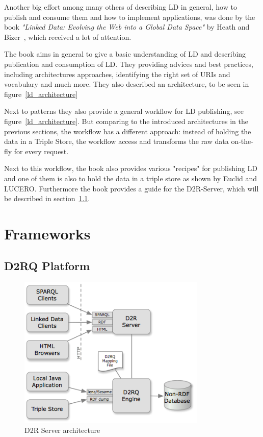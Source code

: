 Another big effort among many others of describing LD in general, how to publish and consume them and how to implement applications, was done by the book \emph{"Linked Data: Evolving the Web into a Global Data Space"} by Heath and Bizer~\cite{heath2011linked}, which received a lot of attention.

The book aims in general to give a basic understanding of LD and describing publication and consumption of LD. They providing advices and best practices, including architectures approaches, identifying the right set of URIs and vocabulary and much more. They also described an architecture, to be seen in figure~\ref{ld_architecture}

Next to patterns they also provide a general workflow for LD publishing, see figure~\ref{ld_architecture}. But comparing to the introduced architectures in the previous sections, the workflow has a different approach: instead of holding the data in a Triple Store, the workflow access and transforms the raw data on-the-fly for every request.

Next to this workflow, the book also provides various "recipes" for publishing LD and one of them is also to hold the data in a triple store as shown by Euclid and LUCERO. Furthermore the book provides a guide for the D2R-Server, which will be described in section~\ref{d2rq}.

\newpage
\section{Frameworks}

\subsection{D2RQ Platform}\label{d2rq}

\begin{figure}[htbp]
	\centering
\includegraphics[width=0.8\textwidth]{img/d2rq_architecture.png}
	\caption{D2R Server architecture}
	\label{d2rq_architecture}
\end{figure}

